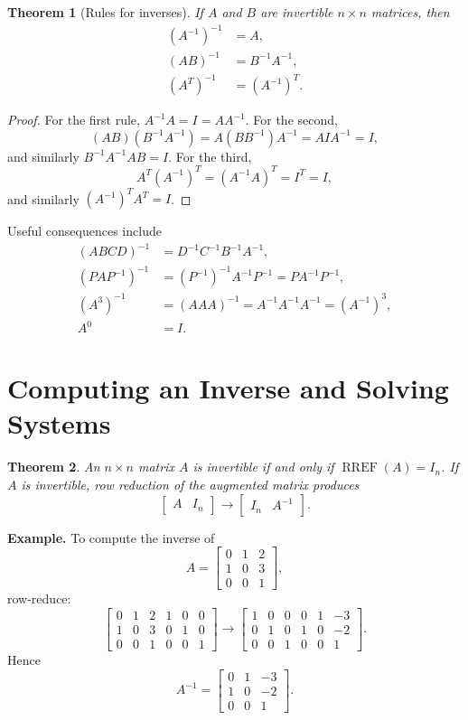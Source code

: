\documentclass[11pt]{article}
\newtheorem*{theorem}{Theorem}
\newcommand{\RREF}{\operatorname{RREF}}
\begin{document}
\begin{theorem}[Rules for inverses]
If $A$ and $B$ are invertible $n\times n$ matrices, then
\begin{align*}
(A^{-1})^{-1}&=A,\\
(AB)^{-1}&=B^{-1}A^{-1},\\
(A^T)^{-1}&=(A^{-1})^T.
\end{align*}
\end{theorem}

\begin{proof}
For the first rule, $A^{-1}A=I=AA^{-1}$.  For the second,
\[
(AB)(B^{-1}A^{-1})=A(BB^{-1})A^{-1}=AIA^{-1}=I,
\]
and similarly $B^{-1}A^{-1}AB=I$.  For the third,
\[
A^T(A^{-1})^T=(A^{-1}A)^T=I^T=I,
\]
and similarly $(A^{-1})^TA^T=I$.
\end{proof}

Useful consequences include
\begin{align*}
(ABCD)^{-1}&=D^{-1}C^{-1}B^{-1}A^{-1},\\
(PAP^{-1})^{-1}&=(P^{-1})^{-1}A^{-1}P^{-1}=PA^{-1}P^{-1},\\
(A^3)^{-1}&=(AAA)^{-1}=A^{-1}A^{-1}A^{-1}=(A^{-1})^3,\\
A^0&=I.
\end{align*}

\section{Computing an Inverse and Solving Systems}

\begin{theorem}
An $n\times n$ matrix $A$ is invertible if and only if $\RREF(A)=I_n$.
If $A$ is invertible, row reduction of the augmented matrix produces
\[
\left[\begin{array}{c|c}A&I_n\end{array}\right]
\longrightarrow
\left[\begin{array}{c|c}I_n&A^{-1}\end{array}\right].
\]
\end{theorem}

\textbf{Example.}  To compute the inverse of
\[
A=\begin{bmatrix}0&1&2\\1&0&3\\0&0&1\end{bmatrix},
\]
row-reduce:
\[
\left[\begin{array}{ccc|ccc}
0&1&2&1&0&0\\
1&0&3&0&1&0\\
0&0&1&0&0&1
\end{array}\right]
\longrightarrow
\left[\begin{array}{ccc|ccc}
1&0&0&0&1&-3\\
0&1&0&1&0&-2\\
0&0&1&0&0&1
\end{array}\right].
\]
Hence
\[
A^{-1}=\begin{bmatrix}0&1&-3\\1&0&-2\\0&0&1\end{bmatrix}.
\]
\end{document}
